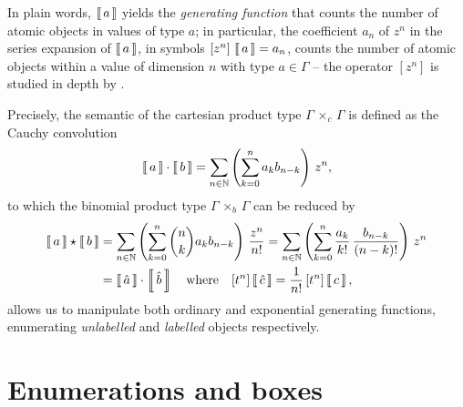 In plain words, $\left\llbracket\,a\,\right\rrbracket$ yields  the \textit{generating function} that
counts the number of atomic objects in values of type $a$; in particular, the
coefficient $a_{n}$ of $z^{n}$ in the series expansion of $\left\llbracket\,a\,\right\rrbracket$, in
symbols $[z^{n}]\,\left\llbracket\,a\,\right\rrbracket = a_{n}$, counts the number of atomic objects
within a value of dimension $n$ with type $a\in\Gamma$ -- the operator
$[z^{n}]$ is studied in depth by \citet{MSV07}.

Precisely, the semantic of the cartesian product type
$\Gamma\,\times_{c}\,\Gamma$ is defined as the Cauchy convolution
\begin{displaymath}
    \left\llbracket\,a\,\right\rrbracket\cdot\left\llbracket\,b\,\right\rrbracket = \sum_{n\in\mathbb{N}}{\left(\sum_{k=0}^{n}{a_{k}b_{n-k}}\right)\,z^{n}},
\end{displaymath}
to which the binomial product type $\Gamma\,\times_{b}\,\Gamma$ can be reduced by
\begin{displaymath}
\begin{split}
    \left\llbracket\,a\,\right\rrbracket\star\left\llbracket\,b\,\right\rrbracket   
        &= \sum_{n\in\mathbb{N}}{\left(\sum_{k=0}^{n}{{ {n}\choose{k} }a_{k}b_{n-k}}\right)\,\frac{z^{n}}{n!}} 
         = \sum_{n\in\mathbb{N}}{\left(\sum_{k=0}^{n}{\frac{a_{k}}{k!}\,\frac{b_{n-k}}{(n-k)!}}\right)\,z^{n}} \\
        &= \left\llbracket\,\hat{a}\,\right\rrbracket\cdot\left\llbracket\,\hat{b}\,\right\rrbracket \quad\text{where}\quad[t^{n}]\left\llbracket\,\hat{c}\,\right\rrbracket = \frac{1}{n!}\,[t^{n}]\left\llbracket\,c\,\right\rrbracket,
\end{split}
\end{displaymath}
allows us to manipulate both ordinary and exponential generating functions,
enumerating \textit{unlabelled} and \textit{labelled} objects respectively.

\section{Enumerations and boxes}

